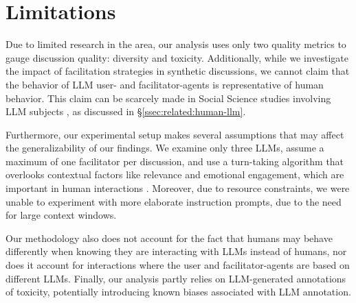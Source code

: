 %
\section{Limitations} 
\label{sec:limitations}

Due to limited research in the area, our analysis uses only two quality metrics to gauge discussion quality: diversity and toxicity. Additionally, while we investigate the impact of facilitation strategies in synthetic discussions, we cannot claim that the behavior of LLM user- and facilitator-agents is representative of human behavior. This claim can be scarcely made in Social Science studies involving LLM subjects \cite{rossi_2024, zhou-etal-2024-real}, as discussed in \S\ref{ssec:related:human-llm}.

Furthermore, our experimental setup makes several assumptions that may affect the generalizability of our findings. We examine only three LLMs, assume a maximum of one facilitator per discussion, and use a turn-taking algorithm that overlooks contextual factors like relevance and emotional engagement, which are important in human interactions \cite{robert_2016_comment, Ziegele03102018}. Moreover, due to resource constraints, we were unable to experiment with more elaborate instruction prompts, due to the need for large context windows. 

Our methodology also does not account for the fact that humans may behave differently when knowing they are interacting with LLMs instead of humans, nor  does it account for interactions where the user and facilitator-agents are based on different LLMs. Finally, our analysis partly relies on LLM-generated annotations of toxicity, potentially introducing known biases associated with LLM annotation.